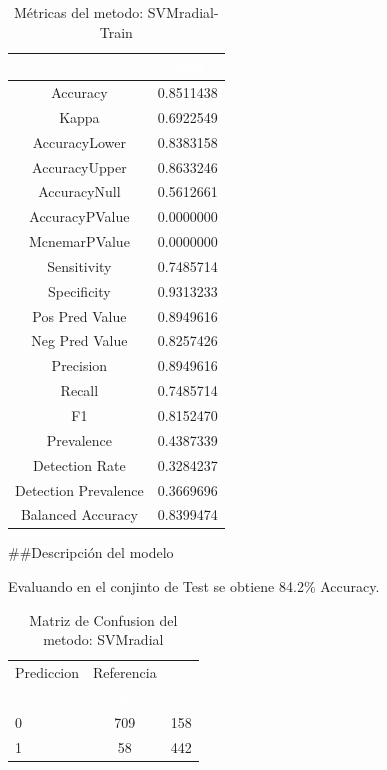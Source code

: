 \documentclass[]{article}
\begin{document}
\begin{table}[!h]

\caption{\label{tab:metricas_SVMradial-Train}Métricas del metodo: SVMradial-Train }
\centering
\begin{tabular}[t]{cc}
\toprule
\rowcolor{black}  \multicolumn{1}{c}{\textcolor{white}{\textbf{metricas}}} & \multicolumn{1}{c}{\textcolor{white}{\textbf{valor}}}\\
\midrule
\rowcolor{gray!6}  Accuracy & 0.8511438\\
Kappa & 0.6922549\\
\rowcolor{gray!6}  AccuracyLower & 0.8383158\\
AccuracyUpper & 0.8633246\\
\rowcolor{gray!6}  AccuracyNull & 0.5612661\\
\addlinespace
AccuracyPValue & 0.0000000\\
\rowcolor{gray!6}  McnemarPValue & 0.0000000\\
Sensitivity & 0.7485714\\
\rowcolor{gray!6}  Specificity & 0.9313233\\
Pos Pred Value & 0.8949616\\
\addlinespace
\rowcolor{gray!6}  Neg Pred Value & 0.8257426\\
Precision & 0.8949616\\
\rowcolor{gray!6}  Recall & 0.7485714\\
F1 & 0.8152470\\
\rowcolor{gray!6}  Prevalence & 0.4387339\\
\addlinespace
Detection Rate & 0.3284237\\
\rowcolor{gray!6}  Detection Prevalence & 0.3669696\\
Balanced Accuracy & 0.8399474\\
\bottomrule
\end{tabular}
\end{table}

\#\#Descripción del modelo

Evaluando en el conjinto de Test se obtiene 84.2\% Accuracy.

\begin{table}[!h]

\caption{\label{tab:MatrizConf_SVMradial}Matriz de Confusion del metodo: SVMradial }
\centering
\begin{tabular}[t]{lcc}
\toprule
\multicolumn{1}{c}{Prediccion} & \multicolumn{1}{c}{Referencia} & \multicolumn{1}{c}{ } \\
\cmidrule(l{3pt}r{3pt}){1-1} \cmidrule(l{3pt}r{3pt}){2-2}
\rowcolor{black}  \multicolumn{1}{c}{\textcolor{white}{\textbf{ }}} & \multicolumn{1}{c}{\textcolor{white}{\textbf{0}}} & \multicolumn{1}{c}{\textcolor{white}{\textbf{1}}}\\
\midrule
\rowcolor{gray!6}  0 & 709 & 158\\
1 & 58 & 442\\
\bottomrule
\end{tabular}
\end{table}
\end{document}
